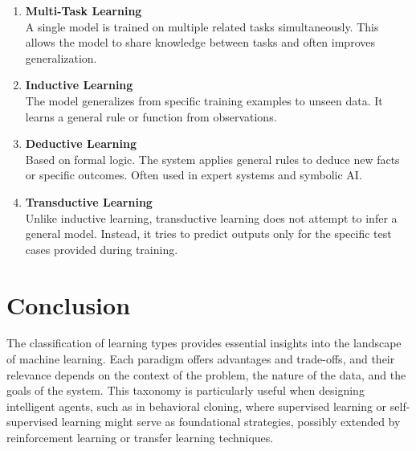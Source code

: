 \documentclass[a4paper,11pt]{article}
\begin{document}
\begin{enumerate}
    \item \textbf{Multi-Task Learning} \\
    A single model is trained on multiple related tasks simultaneously. This allows the model to share knowledge between tasks and often improves generalization.

    \item \textbf{Inductive Learning} \\
    The model generalizes from specific training examples to unseen data. It learns a general rule or function from observations.

    \item \textbf{Deductive Learning} \\
    Based on formal logic. The system applies general rules to deduce new facts or specific outcomes. Often used in expert systems and symbolic AI.

    \item \textbf{Transductive Learning} \\
    Unlike inductive learning, transductive learning does not attempt to infer a general model. Instead, it tries to predict outputs only for the specific test cases provided during training.
\end{enumerate}

\section{Conclusion}

The classification of learning types provides essential insights into the landscape of machine learning. Each paradigm offers advantages and trade-offs, and their relevance depends on the context of the problem, the nature of the data, and the goals of the system. This taxonomy is particularly useful when designing intelligent agents, such as in behavioral cloning, where supervised learning or self-supervised learning might serve as foundational strategies, possibly extended by reinforcement learning or transfer learning techniques.
\end{document}
